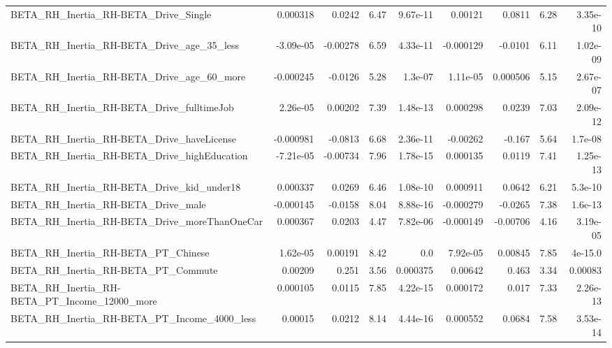\begin{tabular}{lrrrrrrrr}
BETA\_RH\_Inertia\_RH-BETA\_Drive\_Single               &    0.000318 &       0.0242 &     6.47 & 9.67e-11 &    0.00121 &      0.0811 &         6.28 &      3.35e-10 \\
BETA\_RH\_Inertia\_RH-BETA\_Drive\_age\_35\_less          &   -3.09e-05 &     -0.00278 &     6.59 & 4.33e-11 &  -0.000129 &     -0.0101 &         6.11 &      1.02e-09 \\
BETA\_RH\_Inertia\_RH-BETA\_Drive\_age\_60\_more          &   -0.000245 &      -0.0126 &     5.28 &  1.3e-07 &   1.11e-05 &    0.000506 &         5.15 &      2.67e-07 \\
BETA\_RH\_Inertia\_RH-BETA\_Drive\_fulltimeJob          &    2.26e-05 &      0.00202 &     7.39 & 1.48e-13 &   0.000298 &      0.0239 &         7.03 &      2.09e-12 \\
BETA\_RH\_Inertia\_RH-BETA\_Drive\_haveLicense          &   -0.000981 &      -0.0813 &     6.68 & 2.36e-11 &   -0.00262 &      -0.167 &         5.64 &       1.7e-08 \\
BETA\_RH\_Inertia\_RH-BETA\_Drive\_highEducation        &   -7.21e-05 &     -0.00734 &     7.96 & 1.78e-15 &   0.000135 &      0.0119 &         7.41 &      1.25e-13 \\
BETA\_RH\_Inertia\_RH-BETA\_Drive\_kid\_under18          &    0.000337 &       0.0269 &     6.46 & 1.08e-10 &   0.000911 &      0.0642 &         6.21 &       5.3e-10 \\
BETA\_RH\_Inertia\_RH-BETA\_Drive\_male                 &   -0.000145 &      -0.0158 &     8.04 & 8.88e-16 &  -0.000279 &     -0.0265 &         7.38 &       1.6e-13 \\
BETA\_RH\_Inertia\_RH-BETA\_Drive\_moreThanOneCar       &    0.000367 &       0.0203 &     4.47 & 7.82e-06 &  -0.000149 &    -0.00706 &         4.16 &      3.19e-05 \\
BETA\_RH\_Inertia\_RH-BETA\_PT\_Chinese                 &    1.62e-05 &      0.00191 &     8.42 &      0.0 &   7.92e-05 &     0.00845 &         7.85 &       4e-15.0 \\
BETA\_RH\_Inertia\_RH-BETA\_PT\_Commute                 &     0.00209 &        0.251 &     3.56 & 0.000375 &    0.00642 &       0.463 &         3.34 &       0.00083 \\
BETA\_RH\_Inertia\_RH-BETA\_PT\_Income\_12000\_more       &    0.000105 &       0.0115 &     7.85 & 4.22e-15 &   0.000172 &       0.017 &         7.33 &      2.26e-13 \\
BETA\_RH\_Inertia\_RH-BETA\_PT\_Income\_4000\_less        &     0.00015 &       0.0212 &     8.14 & 4.44e-16 &   0.000552 &      0.0684 &         7.58 &      3.53e-14 \\

\end{tabular}
